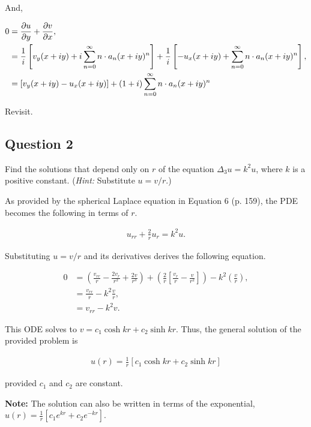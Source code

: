 \documentclass[a4paper, 10pt]{article}
\newenvironment{answer}[1][Answer]{\begin{trivlist}
\item[\hskip\labelsep{\textit{#1.}}]}{\end{trivlist}}
\begin{document}
\begin{answer}
    And, 

    \begin{align*}
        0   &= \partialderivative{u}{y} + \partialderivative{v}{x},\\
            &= \frac{1}{i} \left[v_y (x + i y) + i \sum_{n=0}^\infty n \cdot a_n (x + i y)^n \right] 
            + \frac{1}{i} \left[ - u_x(x+ i y) + \sum_{n=0}^\infty n \cdot a_n (x + i y)^n \right],\\
            &= \left[ v_y (x + i y) - u_x(x+ i y) \right]
               + (1 + i) \sum_{n=0}^\infty n \cdot a_n ( x + i y)^n 
    \end{align*}

    {\color{blue} Revisit.}
\end{answer} 

\subsection{Question 2}

Find the solutions that depend only on $r$ of the equation $\Delta_3 u = k^2 u$, where $k$ is a positive constant. (\textit{Hint:} Substitute $u = v/r$.)

\begin{answer}
    As provided by the spherical Laplace equation in Equation 6 (p. 159), the PDE becomes the following in terms of $r$.

    \begin{align*}
        u_{r r} + \frac{2}{r} u_r = k^2 u.
    \end{align*}

    Substituting $u = v / r$ and its derivatives derives the following equation. 

    \begin{align*}
        0   &= \left( \frac{v_{r r}}{r} - \frac{2 v_r}{r^2} + \frac{2 v}{ r^3 } \right) 
        + \left( \frac{2}{r} \left[ \frac{v_r}{r} - \frac{v}{r^2}  \right] \right)
        - k^2 \left( \frac{v}{r} \right),\\
            &= \frac{v_{r r}}{r} - k^2 \frac{v}{r},\\
            &= v_{r r} - k^2 v.     
    \end{align*}

    This ODE solves to $v = c_1 \cosh{k r} + c_2 \sinh{k r}$. Thus, the general solution of the provided problem is

    \begin{align*}
        u(r) = \frac{1}{r} \left[ c_1 \cosh{k r} + c_2 \sinh{k r} \right] 
    \end{align*}

    provided $c_1$ and $c_2$ are constant. 
    
    {\color{blue} \textbf{Note:} The solution can also be written in terms of the exponential, $u(r) = \frac{1}{r} \left[ c_1 e^{k r} + c_2 e^{-k r} \right]$.}
\end{answer}
\end{document}
